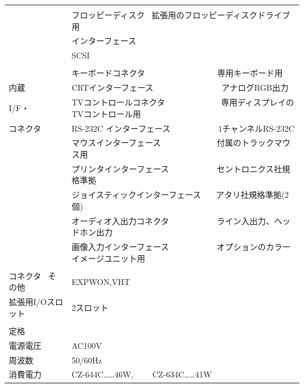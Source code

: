 \documentclass[twoside,a4paper,12pt]{article}
\begin{document}
\begin{tabular}{|p{17mm}|p{13mm}|p{23mm}|p{80mm}|p{30mm}|}
\cline{2-5}
& \multicolumn{4}{l|}{}\\[-3mm]
& \multicolumn{4}{l|}{フロッピーディスク \ 拡張用のフロッピーディスクドライブ用}\\[2mm]
& \multicolumn{4}{l|}{インターフェース}\\[2mm]
& \multicolumn{4}{l|}{SCSI}\\[2mm]
& \multicolumn{4}{l|}{}\\
& \multicolumn{4}{l|}{キーボードコネクタ \ \ \ \ \ \ \ \ \ \ \ \ \ \ \ \ \ 専用キーボード用}\\
内蔵 & \multicolumn{4}{l|}{CRTインターフェース \ \ \ \ \ \ \ \ \ \ \ \ \ \ \ \ アナログRGB出力}\\
I/F・ & \multicolumn{4}{l|}{TVコントロールコネクタ \ \ \ \ \ \ \ \ \ \ \ \ \ 専用ディスプレイのTVコントロール用}\\
コネクタ & \multicolumn{4}{l|}{RS-232C インターフェース \ \ \ \ \ \ \ \ \ \ \ 1チャンネルRS-232C}\\
& \multicolumn{4}{l|}{マウスインターフェース \ \ \ \ \ \ \ \ \ \ \ \ \ 付属のトラックマウス用}\\
& \multicolumn{4}{l|}{プリンタインターフェース \ \ \ \ \ \ \ \ \ \ \ セントロニクス社規格準拠}\\
& \multicolumn{4}{l|}{ジョイスティックインターフェース \ \ \ アタリ社規格準拠(2個)}\\
& \multicolumn{4}{l|}{オーディオ入出力コネクタ \ \ \ \ \ \ \ \ \ \ \ ライン入出力、ヘッドホン出力}\\
& \multicolumn{4}{l|}{画像入力インターフェース \ \ \ \ \ \ \ \ \ \ \ オプションのカラーイメージユニット用}\\
\hline
\multicolumn{3}{|l|}{} & \multicolumn{2}{l|}{}\\[-3mm]
\multicolumn{3}{|l|}{コネクタ \ その他} & \multicolumn{2}{l|}{EXPWON,VHT}\\
\multicolumn{3}{|l|}{拡張用I/Oスロット} & \multicolumn{2}{l|}{2スロット}\\
\hline
& \multicolumn{4}{l|}{}\\[-3mm]
定格 & \multicolumn{4}{l|}{}\\
電源電圧 & \multicolumn{4}{l|}{AC100V}\\
周波数 & \multicolumn{4}{l|}{50/60Hz}\\
消費電力 & \multicolumn{4}{l|}{CZ-644C……46W, \ \ \ \ CZ-634C……41W}\\[2mm]
\hline
\end{tabular}

\newpage
\end{document}
